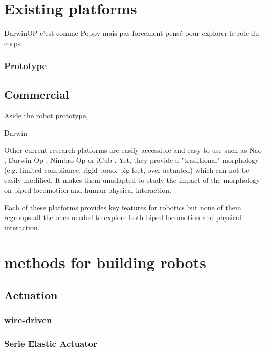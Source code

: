 \section{Existing platforms} %

DarwinOP c'est comme Poppy mais pas forcement pensé pour explorer le role du corps.

\subsubsection{Prototype} %

\subsection{Commercial} %

Aside the robot prototype,

Darwin \cite{ha2011development}

Other current research platforms are easily accessible and easy to use such as Nao \cite{gouaillier2008nao}, Darwin Op \cite{ha2011development}, Nimbro Op \cite{schwarznimbro} or iCub \cite{metta2008icub}.
Yet, they provide a "traditional" morphology (e.g.
limited compliance, rigid torso, big feet, over actuated) which can not be easily modified.
It makes them unadapted to study the impact of the morphology on biped locomotion and human physical interaction.

Each of these platforms provides key features for robotics but none of them regroups all the ones needed to explore both biped locomotion and physical interaction.

\section{methods for building robots} %


\subsection{Actuation} %


\subsubsection{wire-driven} %

\subsubsection{Serie Elastic Actuator} %

